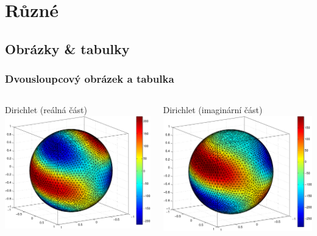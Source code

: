 \documentclass[lualatex,hyperref={pdfencoding=auto}]{beamer}
\begin{document}
\section{Různé}
\subsection{Obrázky \& tabulky}
\begin{frame}
	\frametitle{Dvousloupcový obrázek a tabulka}
	\vspace{-2mm}
	\begin{columns}
		\begin{column}{0.5\textwidth}
			\begin{center}
				Dirichlet (reálná část)
				\includegraphics[height=0.48\textheight]{fig/sphere_mix_real}
			\end{center}
		\end{column}
		\begin{column}{0.5\textwidth}
			\begin{center}
				Dirichlet (imaginární část)
				\includegraphics[height=0.48\textheight]{fig/sphere_mix_imag}

\end{center}
\end{column}
\end{columns}
\end{frame}
\end{document}
